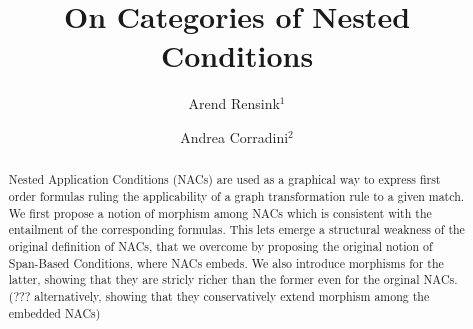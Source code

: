 \title{On Categories of Nested Conditions}

\author{Arend Rensink$^1$ \and Andrea Corradini$^2$}

\maketitle

\begin{abstract}
Nested Application Conditions (NACs) are used as a graphical way to express first order formulas ruling the applicability of a graph transformation rule to a given match. We first propose a notion of morphism among NACs which is consistent with the entailment of the corresponding formulas. This lets emerge
a structural weakness of the original definition of NACs, that we overcome by proposing the original notion of Span-Based Conditions, where NACs embeds. We also introduce morphisms for the latter, showing that they are stricly richer than the former even for the orginal NACs. (??? alternatively, showing that they conservatively extend morphism among the embedded NACs)
\end{abstract}
